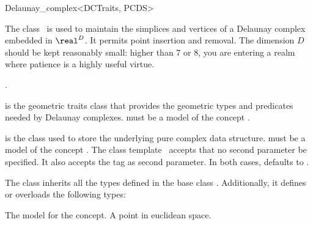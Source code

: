 \begin{ccRefClass}{Delaunay_complex<DCTraits, PCDS>}

\ccDefinition

The class \ccRefName\ is used to maintain the simplices and vertices of a
Delaunay complex embedded in $\real^D$. It permits point insertion and
removal. The dimension $D$ should be kept reasonably small: higher than 7 or
8, you are entering a realm where patience is a highly useful virtue.


\ccInheritsFrom
{}.

\ccParameters

 is the geometric traits class that provides the geometric types
and predicates needed by Delaunay complexes.  must be a model of
the concept .

 is the class used to store the underlying pure complex data
structure.  must be a model of the concept
. The class template \ccRefName\ accepts that no
second parameter be specified. It also accepts the tag  as
second parameter. In both cases,  defaults to
.


\ccTypes %

The class  inherits all the types
defined in the base class . Additionally, it
defines or overloads the following types:

%
{The model for the  concept.}
%
{A point in euclidean space.}


\ccCreation %





\end{ccRefClass}
